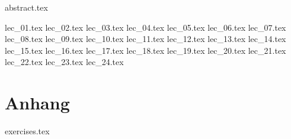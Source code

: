 \documentclass[fancyfoot, a4paper, ngerman, git]{mkessler-script}
\author{Maximilian Keßler}
\begin{document}
    \maketitle

    {abstract.tex}
    
    \cleardoublepage
    \tableofcontents

    \cleardoublepage
    \summaryoflectures

    \cleardoublepage
    {lec_01.tex}
    {lec_02.tex}
    {lec_03.tex}
    {lec_04.tex}
    {lec_05.tex}
    {lec_06.tex}
    {lec_07.tex}
    {lec_08.tex}
    {lec_09.tex}
    {lec_10.tex}
    {lec_11.tex}
    {lec_12.tex}
    {lec_13.tex}
    {lec_14.tex}
    {lec_15.tex}
    {lec_16.tex}
    {lec_17.tex}
    {lec_18.tex}
    {lec_19.tex}
    {lec_20.tex}
    {lec_21.tex}
    {lec_22.tex}
    {lec_23.tex}
    {lec_24.tex}

    \cleardoublepage
    \appendix
    \part{Anhang}

    {exercises.tex}
    
    \cleardoublepage

    \cleardoublepage
    \printvocabindex

    \cleardoublepage
    \printimageattributions

    \cleardoublepage
    \printliterature
\end{document}
